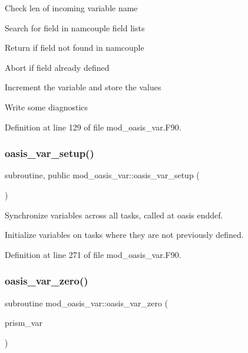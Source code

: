 \begin{DoxyItemize}
\item Check len of incoming variable name
\item Search for field in namcouple field lists
\item Return if field not found in namcouple
\item Abort if field already defined
\item Increment the variable and store the values
\item Write some diagnostics 
\end{DoxyItemize}

Definition at line 129 of file mod\+\_\+oasis\+\_\+var.\+F90.

\mbox{\label{namespacemod__oasis__var_ab33b7fbec62bcfd15e9cd7f912f71035}} 
\subsubsection{\texorpdfstring{oasis\+\_\+var\+\_\+setup()}{oasis\_var\_setup()}}
{\footnotesize\ttfamily subroutine, public mod\+\_\+oasis\+\_\+var\+::oasis\+\_\+var\+\_\+setup (\begin{DoxyParamCaption}{ }\end{DoxyParamCaption})}



Synchronize variables across all tasks, called at oasis enddef. 


\begin{DoxyItemize}
\item Initialize variables on tasks where they are not previously defined. 
\end{DoxyItemize}

Definition at line 271 of file mod\+\_\+oasis\+\_\+var.\+F90.

\mbox{\label{namespacemod__oasis__var_aa780f62e9eded0a55d0077a990bf2443}} 
\subsubsection{\texorpdfstring{oasis\+\_\+var\+\_\+zero()}{oasis\_var\_zero()}}
{\footnotesize\ttfamily subroutine mod\+\_\+oasis\+\_\+var\+::oasis\+\_\+var\+\_\+zero (\begin{DoxyParamCaption}\item[{type(\hyperlink{structmod__oasis__var_1_1prism__var__type}{prism\+\_\+var\+\_\+type}), intent(inout)}]{prism\+\_\+var }\end{DoxyParamCaption})\hspace{0.3cm}{\ttfamily [private]}}



